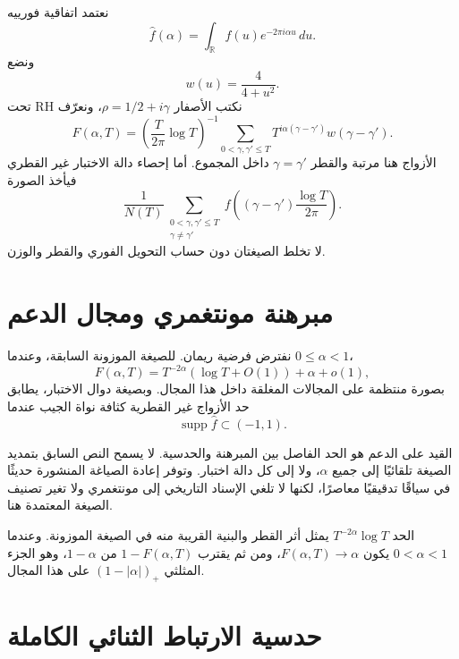 \begin{definition}
\label{def:ch23-pair-correlation}
\provedhere
نعتمد اتفاقية فورييه
\[
\widehat f(\alpha)=\int_{\mathbb R}f(u)e^{-2\pi i\alpha u}\,du.
\]
ونضع
\[
w(u)=\frac{4}{4+u^2}.
\]
تحت RH نكتب الأصفار \(\rho=1/2+i\gamma\)، ونعرّف
\[
F(\alpha,T)=
\left(\frac{T}{2\pi}\log T\right)^{-1}
\sum_{0<\gamma,\gamma'\le T}
T^{i\alpha(\gamma-\gamma')}w(\gamma-\gamma').
\]
الأزواج هنا مرتبة والقطر \(\gamma=\gamma'\) داخل المجموع. أما إحصاء دالة الاختبار غير القطري فيأخذ الصورة
\[
\frac{1}{N(T)}
\sum_{\substack{0<\gamma,\gamma'\le T\\ \gamma\ne\gamma'}}
f\!\left((\gamma-\gamma')\frac{\log T}{2\pi}\right).
\]
لا تخلط الصيغتان دون حساب التحويل الفوري والقطر والوزن.
\end{definition}

\section{مبرهنة مونتغمري ومجال الدعم}

\begin{theorem}
\label{thm:ch23-montgomery}
نفترض فرضية ريمان. للصيغة الموزونة السابقة، وعندما \(0\le\alpha<1\)،
\[
F(\alpha,T)
=
T^{-2\alpha}(\log T+O(1))+\alpha+o(1),
\]
بصورة منتظمة على المجالات المغلقة داخل هذا المجال. وبصيغة دوال الاختبار، يطابق حد الأزواج غير القطرية كثافة نواة الجيب عندما
\[
\operatorname{supp}\widehat f\subset(-1,1).
\]
\end{theorem}

القيد على الدعم هو الحد الفاصل بين المبرهنة والحدسية. لا يسمح النص السابق بتمديد الصيغة تلقائيًا إلى جميع \(\alpha\)، ولا إلى كل دالة اختبار. وتوفر إعادة الصياغة المنشورة حديثًا في \cite{baluyot2024unconditional} سياقًا تدقيقيًا معاصرًا، لكنها لا تلغي الإسناد التاريخي إلى مونتغمري ولا تغير تصنيف الصيغة المعتمدة هنا.

الحد \(T^{-2\alpha}\log T\) يمثل أثر القطر والبنية القريبة منه في الصيغة الموزونة. وعندما \(0<\alpha<1\) يكون \(F(\alpha,T)\to\alpha\)، ومن ثم يقترب \(1-F(\alpha,T)\) من \(1-\alpha\)، وهو الجزء المثلثي \((1-|\alpha|)_+\) على هذا المجال.

\section{حدسية الارتباط الثنائي الكاملة}

